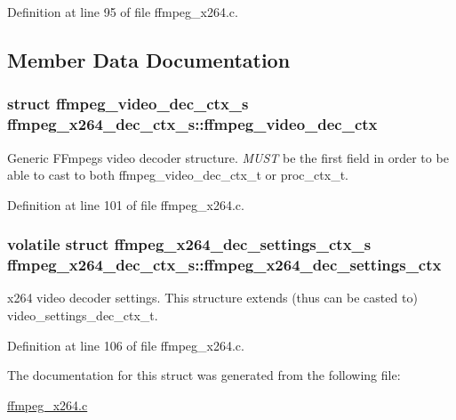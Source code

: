 Definition at line 95 of file ffmpeg\+\_\+x264.\+c.



\subsection{Member Data Documentation}
\subsubsection[{\texorpdfstring{ffmpeg\+\_\+video\+\_\+dec\+\_\+ctx}{ffmpeg_video_dec_ctx}}]{\setlength{\rightskip}{0pt plus 5cm}struct {\bf ffmpeg\+\_\+video\+\_\+dec\+\_\+ctx\+\_\+s} ffmpeg\+\_\+x264\+\_\+dec\+\_\+ctx\+\_\+s\+::ffmpeg\+\_\+video\+\_\+dec\+\_\+ctx}\hypertarget{structffmpeg__x264__dec__ctx__s_a25ec0cfebb46f74b12f5229e3908d7b7}{}\label{structffmpeg__x264__dec__ctx__s_a25ec0cfebb46f74b12f5229e3908d7b7}
Generic F\+Fmpeg\textquotesingle{}s video decoder structure. {\itshape M\+U\+ST} be the first field in order to be able to cast to both ffmpeg\+\_\+video\+\_\+dec\+\_\+ctx\+\_\+t or proc\+\_\+ctx\+\_\+t. 

Definition at line 101 of file ffmpeg\+\_\+x264.\+c.

\subsubsection[{\texorpdfstring{ffmpeg\+\_\+x264\+\_\+dec\+\_\+settings\+\_\+ctx}{ffmpeg_x264_dec_settings_ctx}}]{\setlength{\rightskip}{0pt plus 5cm}volatile struct {\bf ffmpeg\+\_\+x264\+\_\+dec\+\_\+settings\+\_\+ctx\+\_\+s} ffmpeg\+\_\+x264\+\_\+dec\+\_\+ctx\+\_\+s\+::ffmpeg\+\_\+x264\+\_\+dec\+\_\+settings\+\_\+ctx}\hypertarget{structffmpeg__x264__dec__ctx__s_a4b7eeb30edd5fc36212f33c1becf9fdf}{}\label{structffmpeg__x264__dec__ctx__s_a4b7eeb30edd5fc36212f33c1becf9fdf}
x264 video decoder settings. This structure extends (thus can be casted to) video\+\_\+settings\+\_\+dec\+\_\+ctx\+\_\+t. 

Definition at line 106 of file ffmpeg\+\_\+x264.\+c.



The documentation for this struct was generated from the following file\+:\begin{DoxyCompactItemize}
\item 
\hyperlink{ffmpeg__x264_8c}{ffmpeg\+\_\+x264.\+c}\end{DoxyCompactItemize}

